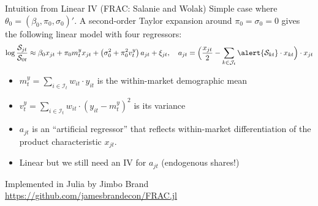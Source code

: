 \begin{frame}{Intuition from Linear IV (FRAC: Salanie and Wolak)}
Simple case where $\theta_0 = (\beta_0, \pi_0, \sigma_0)'$. A second-order Taylor expansion around $\pi_0 = \sigma_0 = 0$ gives the following linear model with four regressors:
\begin{align*}
    \log\frac{\mathcal{S}_{jt}}{\mathcal{S}_{0t}} \approx \beta_0 x_{jt} + \pi_0 m_t^y x_{jt} + \left(\sigma_0^2+  \pi_0^2 v_t^y \right) a_{jt} + \xi_{jt}, \quad a_{jt} = \Big(\frac{x_{jt}}{2} - \sum_{k \in \mathcal{J}_t} \alert{\mathcal{S}_{kt}} \cdot x_{kt}\Big) \cdot x_{jt}
\end{align*}
\begin{itemize}
    \item $m_t^y = \sum_{i \in \mathcal{I}_t} w_{it} \cdot y_{it}$ is the within-market demographic mean
    \item $v_t^y = \sum_{i \in \mathcal{I}_t} w_{it} \cdot (y_{it} - m_t^y)^2$ is its variance
    \item $a_{jt}$ is an ``artificial regressor'' that reflects within-market differentiation of the product characteristic $x_{jt}$.\\
    \item Linear but we still need an IV for $a_{jt}$ (\alert{endogenous shares!})
\end{itemize}
Implemented in Julia by Jimbo Brand  \url{https://github.com/jamesbrandecon/FRAC.jl}
\end{frame}


